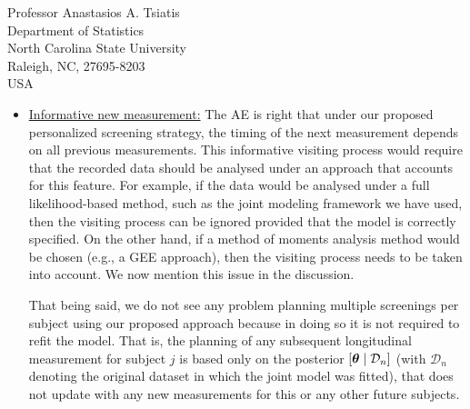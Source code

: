\documentclass[a4paper, 11pt]{letter}
\newcommand{\bftheta}{\mbox{{\boldmath $\theta$}}}
\begin{document}
\begin{letter}{Professor Anastasios A. Tsiatis\\
Department of Statistics\\
North Carolina State University\\
Raleigh, NC, 27695-8203\\
USA}
\begin{itemize}
\begin{enumerate}
    \item \underline{Cost:} Assuming that the monetary cost of each examination remains (roughly) the same during follow-up, we would prefer a procedure that requires the fewest possible screenings.

    \item \underline{Effectiveness:} On the other hand, we would also like to get as close as possible to the optimal time point at which a medical action is required. Following the advice of the AE, we assess effectiveness based on the accuracy of survival risk prediction. In particular, we first find for each patient the \emph{true} optimal intervention time point $t_j^{opt}$ as the time point for which the \emph{true} conditional survival probability $\pi_j^{true}(t_j^{opt} + \Delta t \mid t_j^{opt})$ equals $\kappa$. Following, for each patient we compare two screening strategies, namely, the standard fixed-intervals screening, in which all patients come back at the same fixed intervals (namely every two years as in the Aortic Valve study), and our personalized screening strategy. For each strategy we also find the optimal re-operation time point and compare it to the true one. More details on the exact manner in which this study was performed can be found in Section~5 of the paper and Section~3 of the supplementary material. The results, presented in Figure~2, showed that the personalized strategy requires fewer screenings and reaches the optimal intervention time point with less absolute error.
    \end{enumerate}

\item \underline{Informative new measurement:} The AE is right that under our proposed personalized screening strategy, the timing of the next measurement depends on all previous measurements. This informative visiting process would require that the recorded data should be analysed under an approach that accounts for this feature. For example, if the data would be analysed under a full likelihood-based method, such as the joint modeling framework we have used, then the visiting process can be ignored provided that the model is correctly specified. On the other hand, if a method of moments analysis method would be chosen (e.g., a GEE approach), then the visiting process needs to be taken into account. We now mention this issue in the discussion.

    That being said, we do not see any problem planning multiple screenings per subject using our proposed approach because in doing so it is not required to refit the model. That is, the planning of any subsequent longitudinal measurement for subject $j$ is based only on the posterior $[\bftheta \mid \mathcal D_n]$ (with $\mathcal D_n$ denoting the original dataset in which the joint model was fitted), that does not update with any new measurements for this or any other future subjects.
\end{itemize}


\end{letter}
\end{document}
